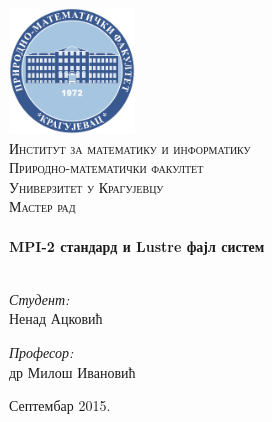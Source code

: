 %
%

\begin{titlepage}

\begin{center}

\includegraphics[width=0.25\textwidth]{logo-pmf.pdf}\\[1cm]    

\textsc{\LARGE Институт за математику и информатику
\\ Природно-математички факултет
\\ Универзитет у Крагујевцу}\\[1.5cm]

\textsc{\Large Мастер рад}\\[0.5cm]

\HRule \\[0.4cm]
{ \huge \bfseries MPI-2 стандард и Lustre фајл систем}\\[0.4cm]

\HRule \\[1.5cm]

\begin{minipage}{0.4\textwidth}
\begin{flushleft} \large
\emph{Студент:}\\
Ненад Ацковић
\end{flushleft}
\end{minipage}
\begin{minipage}{0.4\textwidth}
\begin{flushright} \large
\emph{Професор:} \\
др Милош Ивановић
\end{flushright}
\end{minipage}

\vfill

{\large Септембар 2015.}

\end{center}

\end{titlepage}
